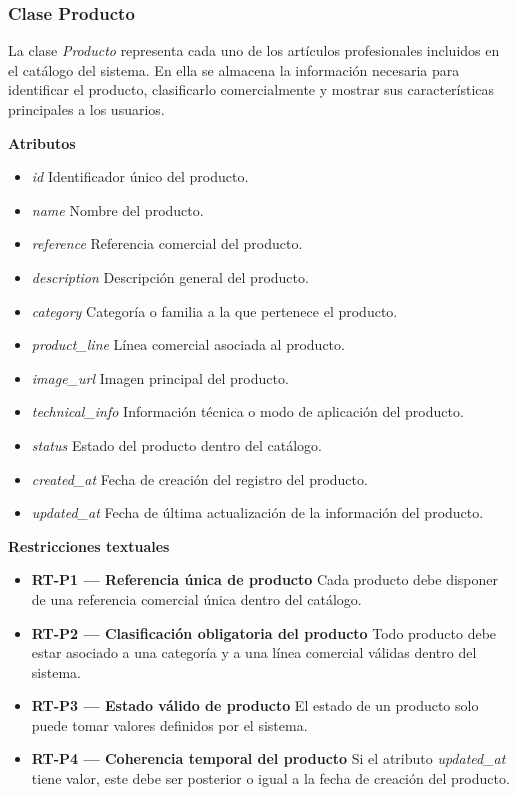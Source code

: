 \subsubsection{Clase Producto}

La clase \textit{Producto} representa cada uno de los artículos profesionales incluidos en el catálogo del sistema. En ella se almacena la información necesaria para identificar el producto, clasificarlo comercialmente y mostrar sus características principales a los usuarios.

\textbf{Atributos}

\begin{itemize}
      \item \textit{id}
            Identificador único del producto.
      \item \textit{name}
            Nombre del producto.
      \item \textit{reference}
            Referencia comercial del producto.
      \item \textit{description}
            Descripción general del producto.
      \item \textit{category}
            Categoría o familia a la que pertenece el producto.
      \item \textit{product\_line}
            Línea comercial asociada al producto.
      \item \textit{image\_url}
            Imagen principal del producto.
      \item \textit{technical\_info}
            Información técnica o modo de aplicación del producto.
      \item \textit{status}
            Estado del producto dentro del catálogo.
      \item \textit{created\_at}
            Fecha de creación del registro del producto.
      \item \textit{updated\_at}
            Fecha de última actualización de la información del producto.
\end{itemize}

\textbf{Restricciones textuales}

\begin{itemize}
      \item \textbf{RT-P1 — Referencia única de producto}
            Cada producto debe disponer de una referencia comercial única dentro del catálogo.
      \item \textbf{RT-P2 — Clasificación obligatoria del producto}
            Todo producto debe estar asociado a una categoría y a una línea comercial válidas dentro del sistema.
      \item \textbf{RT-P3 — Estado válido de producto}
            El estado de un producto solo puede tomar valores definidos por el sistema.
      \item \textbf{RT-P4 — Coherencia temporal del producto}
            Si el atributo \textit{updated\_at} tiene valor, este debe ser posterior o igual a la fecha de creación del producto.
\end{itemize}

